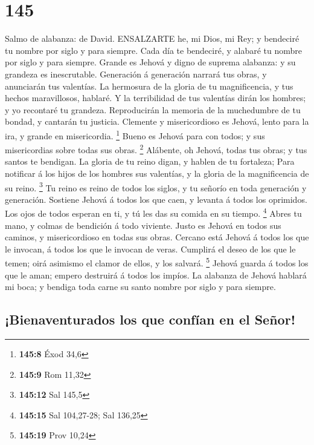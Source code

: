 \hypertarget{section-144}{%
\section{145}\label{section-144}}

 Salmo de alabanza: de David. ENSALZARTE he, mi Dios, mi
Rey; y bendeciré tu nombre por siglo y para siempre.  Cada
día te bendeciré, y alabaré tu nombre por siglo y para siempre.
 Grande es Jehová y digno de suprema alabanza: y su grandeza
es inescrutable.  Generación á generación narrará tus obras,
y anunciarán tus valentías.  La hermosura de la gloria de tu
magnificencia, y tus hechos maravillosos, hablaré.  Y la
terribilidad de tus valentías dirán los hombres; y yo recontaré tu
grandeza.  Reproducirán la memoria de la muchedumbre de tu
bondad, y cantarán tu justicia.  Clemente y misericordioso
es Jehová, lento para la ira, y grande en misericordia. \footnote{\textbf{145:8}
  Éxod 34,6}  Bueno es Jehová para con todos; y sus
misericordias sobre todas sus obras. \footnote{\textbf{145:9} Rom 11,32}
 Alábente, oh Jehová, todas tus obras; y tus santos te
bendigan.  La gloria de tu reino digan, y hablen de tu
fortaleza;  Para notificar á los hijos de los hombres sus
valentías, y la gloria de la magnificencia de su reino. \footnote{\textbf{145:12}
  Sal 145,5}  Tu reino es reino de todos los siglos, y tu
señorío en toda generación y generación.  Sostiene Jehová á
todos los que caen, y levanta á todos los oprimidos.  Los
ojos de todos esperan en ti, y tú les das su comida en su tiempo.
\footnote{\textbf{145:15} Sal 104,27-28; Sal 136,25}  Abres
tu mano, y colmas de bendición á todo viviente.  Justo es
Jehová en todos sus caminos, y misericordioso en todas sus obras.
 Cercano está Jehová á todos los que le invocan, á todos
los que le invocan de veras.  Cumplirá el deseo de los que
le temen; oirá asimismo el clamor de ellos, y los salvará. \footnote{\textbf{145:19}
  Prov 10,24}  Jehová guarda á todos los que le aman;
empero destruirá á todos los impíos.  La alabanza de Jehová
hablará mi boca; y bendiga toda carne su santo nombre por siglo y para
siempre.

\hypertarget{bienaventurados-los-que-confuxedan-en-el-seuxf1or}{%
\subsection{¡Bienaventurados los que confían en el
Señor!}\label{bienaventurados-los-que-confuxedan-en-el-seuxf1or}}

